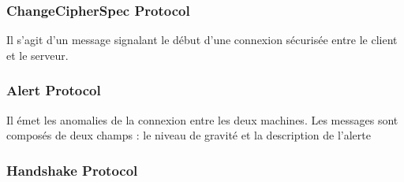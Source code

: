 \subsubsection{ChangeCipherSpec Protocol}
Il s'agit d'un message signalant le début d'une connexion sécurisée entre le client et le serveur.

\subsubsection{Alert Protocol}
Il émet les anomalies de la connexion entre les deux machines.
Les messages sont composés de deux champs : le niveau de gravité et la description de l'alerte

\subsubsection{Handshake Protocol}

